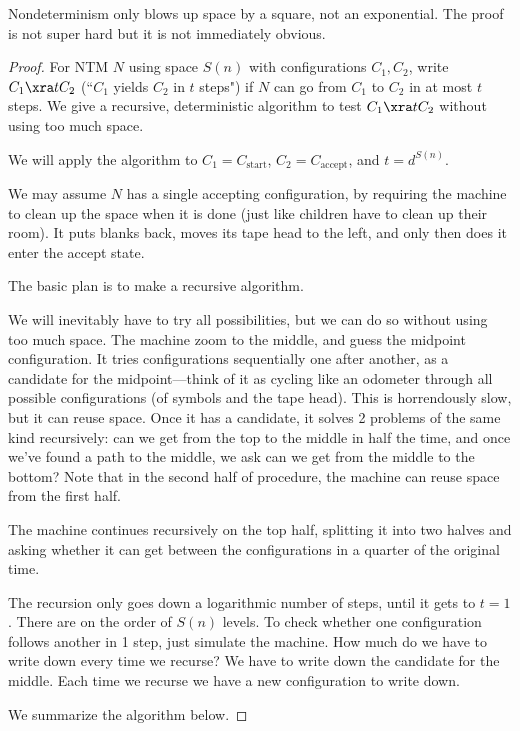 Nondeterminism only blows up space by a square, not an exponential. The proof is not super hard but it is not immediately obvious.
\begin{proof}
For NTM $N$ using space $S(n)$ with configurations $C_1,C_2$, write $C_1\xra tC_2$ (``$C_1$ yields $C_2$ in $t$ steps")  if $N$ can go from $C_1$ to $C_2$ in at most $t$ steps. We give a recursive, deterministic algorithm to test $C_1\xra tC_2$ without using too much space. 

We will apply the algorithm to $C_1=C_{\text{start}}$, $C_2=C_{\text{accept}}$, and $t=d^{S(n)}$. 

We may assume $N$ has a single accepting configuration, by  requiring the machine to clean up the space when it is done (just like children have to clean up their room). It puts blanks back, moves its tape head to the left, and only then does it enter the accept state.

The basic plan is to make a recursive algorithm.


We will inevitably have to try all possibilities, but we can do so without using too much space. 
The machine zoom to the middle, and guess the midpoint configuration. It tries configurations sequentially one after another, as a candidate for the midpoint---think of it as cycling like an odometer through all possible configurations (of symbols and the tape head). This is horrendously slow, but it can reuse space. Once it has a candidate, it solves 2 problems of the same kind recursively: can we get from the top to the middle in half the time, and once we've found a path to the middle, we ask can we get from the middle to the bottom? %
Note that in the second half of procedure, the machine can reuse space from the first half. 

The machine continues recursively on the top half, splitting it into two halves and asking whether it can get between the configurations in a quarter of the original time.

The recursion only goes down a logarithmic number of steps, until it gets to $t=1$. There are on the order of $S(n)$ levels. To check whether one configuration follows another in 1 step, just simulate the machine. How much do we have to write down every time we recurse? We have to write down the candidate for the middle. Each time we recurse we have a new configuration to write down.

We summarize the algorithm below.


\end{proof}
